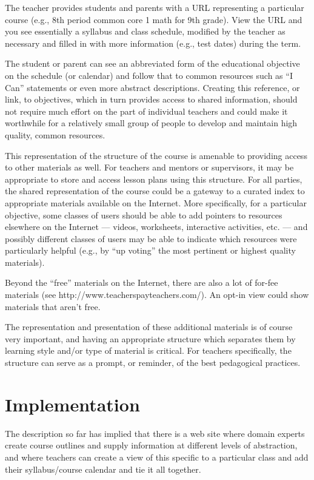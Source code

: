 The teacher provides students and parents with a URL representing
a particular course (e.g., 8th period common core 1 math for 9th grade).
View the URL and you see essentially a syllabus and class schedule,
modified by the teacher as necessary and filled in with more information
(e.g., test dates) during the term.

The student or parent can see an abbreviated form of the educational objective
on the schedule (or calendar)
and follow that to common resources such as ``I Can'' statements
or even more abstract descriptions.  Creating this reference, or link, to objectives,
which in turn provides access to shared information, should not require much effort 
on the part of individual teachers and could make it worthwhile for a relatively small
group of people to develop and maintain high quality, common resources.

This representation of the structure of the course is amenable to providing access to other
materials as well.  For teachers and mentors or supervisors, it may be appropriate to 
store and access lesson plans using this structure.  For all parties,
the shared representation of the course could be a gateway to a curated index
to appropriate materials available on the Internet.  More specifically, for a particular objective,
some classes of users should be able to add pointers to resources elsewhere on the 
Internet --- videos, worksheets, interactive activities, etc. --- and
possibly different classes of users may be able to indicate which resources
were particularly helpful (e.g., by ``up voting'' the most pertinent or
highest quality materials).

Beyond the ``free'' materials on the Internet, there are also a lot of
for-fee materials (see http://www.teacherspayteachers.com/).  An opt-in
view could show materials that aren't free.

The representation and presentation of these additional materials is of
course very important, and having an appropriate structure which separates them
by learning style and/or type of material is critical.  For teachers specifically,
the structure can serve as a prompt, or reminder, of the best pedagogical practices.

\section*{Implementation}

The description so far has implied that there is a web site where domain
experts create course outlines and supply information at different levels 
of abstraction, and where teachers can create a view of this specific to
a particular class and add their syllabus/course calendar and tie it all
together.

